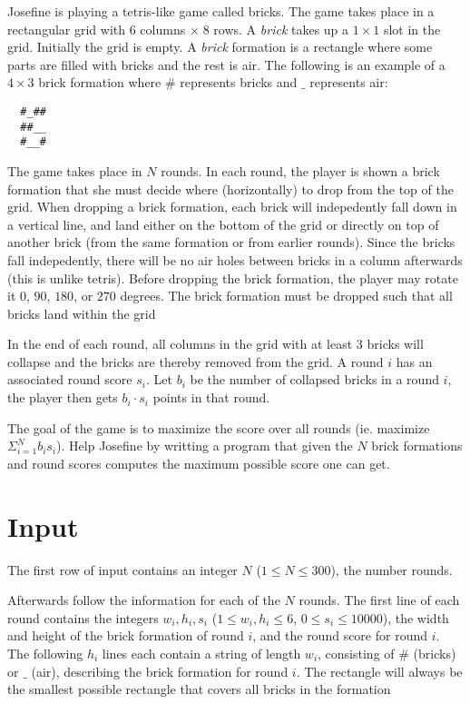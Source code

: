 \def\version{1}

Josefine is playing a tetris-like game called bricks. The game takes place in a rectangular grid
with $6$ columns $\times \; 8$ rows. A \textit{brick} takes up a $1 \times 1$ slot in the grid. Initially the grid is empty.
A \textit{brick} formation is a rectangle where some parts are filled with bricks and the rest is air.
The following is an example of a $4 \times 3$ brick formation where $\#$ represents bricks and $\_$
represents air:

\noindent
\begin{verbatim}
  #_##
  ##__
  #__#
\end{verbatim}

The game takes place in $N$ rounds. In each round, the player is shown a brick formation that
she must decide where (horizontally) to drop from the top of the grid. When dropping a brick
formation, each brick will indepedently fall down in a vertical line, and land either on the
bottom of the grid or directly on top of another brick (from the same formation or from
earlier rounds). Since the bricks fall indepedently, there will be no air holes between bricks in
a column afterwards (this is unlike tetris). Before dropping the brick formation, the player
may rotate it $0$, $90$, $180$, or $270$ degrees. The brick formation must be dropped such that all
bricks land within the grid

In the end of each round, all columns in the grid with at least $3$ bricks will collapse and the
bricks are thereby removed from the grid. A round $i$ has an associated round score $s_i$. Let $b_i$
be the number of collapsed bricks in a round $i$, the player then gets $b_i \cdot s_i$ points in that
round.

The goal of the game is to maximize the score over all rounds (ie. maximize $\Sigma_{i=1}^{N} b_i s_i$). Help
Josefine by writting a program that given the $N$ brick formations and round scores
computes the maximum possible score one can get.

\section*{Input}
\noindent
The first row of input contains an integer $N$ ($1 \leq N \leq 300$), the number rounds.

Afterwards follow the information for each of the $N$ rounds. The first line of each round contains 
the integers $w_i, h_i, s_i$ ($1 \leq w_i, h_i \leq 6$, $0 \leq s_i \leq 10000$), the width and height
of the brick formation of round $i$, and the round score for round $i$.
The following $h_i$ lines each contain a string of length $w_i$, consisting of $\#$ (bricks) or $\_$ (air), 
describing the brick formation for round $i$. The rectangle will always be the
smallest possible rectangle that covers all bricks in the formation

